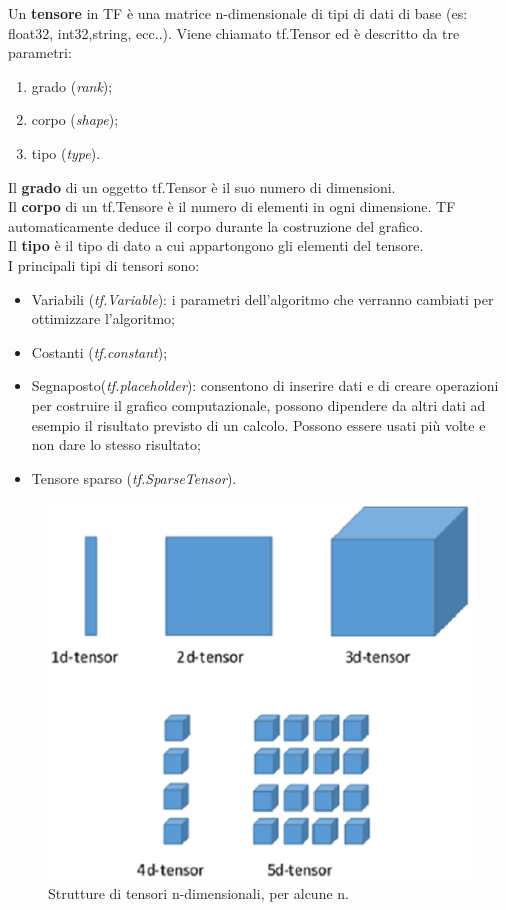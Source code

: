 \documentclass[a4paper,12pt,oneside]{book}
\begin{document}
\begin{defin}
Un \textbf{tensore} in TF \`{e} una matrice n-dimensionale di tipi di dati di base (es: float32, int32,string, ecc..). Viene chiamato tf.Tensor ed \`{e} descritto da tre parametri:
\begin{enumerate}
\item grado  (\textit{rank});
\item corpo (\textit{shape});
\item tipo (\textit{type}).
\end{enumerate}
\end{defin}
Il \textbf{grado} di un oggetto tf.Tensor \`{e} il suo numero di dimensioni.\\
Il \textbf{corpo} di un tf.Tensore \`{e} il numero di elementi in ogni dimensione. TF automaticamente deduce il corpo durante la costruzione del grafico.\\
Il \textbf{tipo} \`{e} il tipo di dato a cui appartongono gli elementi del tensore.\\
I principali tipi di tensori sono:
\begin{itemize}
\item Variabili (\textit{tf.Variable}): i parametri dell'algoritmo che verranno cambiati per ottimizzare l'algoritmo;
\item Costanti (\textit{tf.constant});
\item Segnaposto(\textit{tf.placeholder}): consentono di inserire dati e di creare operazioni per costruire il grafico computazionale, possono dipendere da altri dati ad esempio il risultato previsto di un calcolo. Possono essere usati pi\`{u} volte e non dare lo stesso risultato;
\item Tensore sparso (\textit{tf.SparseTensor}).
\end{itemize}
\begin{figure}[!h]
\centering
\includegraphics[scale=0.7]{tensori}
\caption{Strutture di tensori n-dimensionali, per alcune n.}
\end{figure}
\newpage
\end{document}
